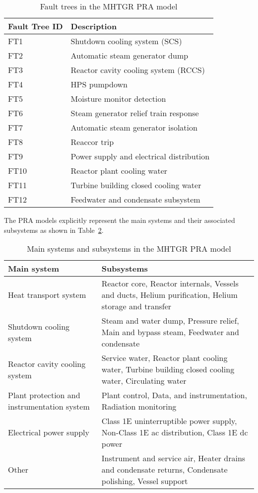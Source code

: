 \begin{table}[H]
    \centering
    \caption{Fault trees in the MHTGR PRA model}
    \label{tab:mhtgr-fault-trees}
    \begin{tabular}{ll}
        \toprule
        \textbf{Fault Tree ID} & \textbf{Description} \\
        \midrule
        FT1 & Shutdown cooling system (SCS) \\
        FT2 & Automatic steam generator dump \\
        FT3 & Reactor cavity cooling system (RCCS) \\
        FT4 & HPS pumpdown \\
        FT5 & Moisture monitor detection \\
        FT6 & Steam generator relief train response \\
        FT7 & Automatic steam generator isolation \\
        FT8 & Reaccor trip \\
        FT9 & Power supply and electrical distribution \\
        FT10 & Reactor plant cooling water \\
        FT11 & Turbine building closed cooling water \\
        FT12 & Feedwater and condensate subsystem \\
        \bottomrule
    \end{tabular}
\end{table}

The PRA models explicitly represent the main systems and their associated subsystems as shown in Table~\ref{tab:mhtgr-sscs}.

\begin{table}[H]
    \centering
    \caption{Main systems and subsystems in the MHTGR PRA model}
    \label{tab:mhtgr-sscs}
    \begin{tabular}{p{7cm} p{8.5cm}}
        \toprule
        \textbf{Main system} & \textbf{Subsystems} \\
        \midrule
        Heat transport system & Reactor core, Reactor internals, Vessels and ducts, Helium purification, Helium storage and transfer \\
        Shutdown cooling system & Steam and water dump, Pressure relief, Main and bypass steam, Feedwater and condensate \\
        Reactor cavity cooling system & Service water, Reactor plant cooling water, Turbine building closed cooling water, Circulating water \\
        Plant protection and instrumentation system & Plant control, Data, and instrumentation, Radiation monitoring \\
        Electrical power supply & Class 1E uninterruptible power supply, Non-Class 1E ac distribution, Class 1E dc power \\
        Other & Instrument and service air, Heater drains and condensate returns, Condensate polishing, Vessel support \\
        \bottomrule
    \end{tabular}
\end{table}

